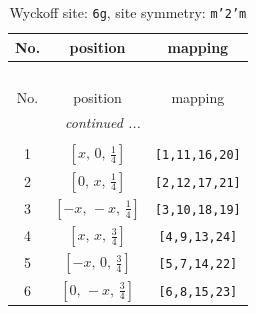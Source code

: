\documentclass[fleqn,8pt]{jsarticle}
\begin{document}
\renewcommand{\arraystretch}{1.2}
\begin{longtable}{ccc}
\caption{Wyckoff site: {\tt 6g}, site symmetry: {\tt m'2'm}}
 \\
 \hline \hline
No. & position & mapping \\ \hline \endfirsthead

\multicolumn{2}{l}{\tablename\ \thetable{}} \\
 \hline \hline
No. & position & mapping \\ \hline \endhead

 \hline \hline
\multicolumn{2}{r}{\footnotesize\it continued ...} \\ \endfoot

 \hline \hline
\multicolumn{2}{r}{} \\ \endlastfoot

1 & $\left[ x,\, 0,\, \frac{1}{4} \right]$ & {\tt [1,11,16,20]} \\ \hline
2 & $\left[ 0,\, x,\, \frac{1}{4} \right]$ & {\tt [2,12,17,21]} \\ \hline
3 & $\left[ - x,\, - x,\, \frac{1}{4} \right]$ & {\tt [3,10,18,19]} \\ \hline
4 & $\left[ x,\, x,\, \frac{3}{4} \right]$ & {\tt [4,9,13,24]} \\ \hline
5 & $\left[ - x,\, 0,\, \frac{3}{4} \right]$ & {\tt [5,7,14,22]} \\ \hline
6 & $\left[ 0,\, - x,\, \frac{3}{4} \right]$ & {\tt [6,8,15,23]} \\
\end{longtable}
\renewcommand{\arraystretch}{1.2}
\end{document}
